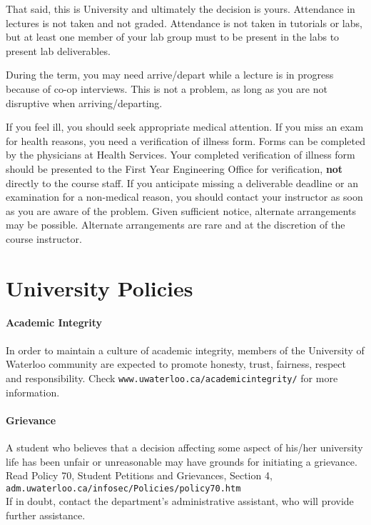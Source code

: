 \documentclass[letterpaper,10pt]{article}
\begin{document}
That said, this is University and ultimately the decision is yours. Attendance in lectures is not taken and not graded. Attendance is not taken in tutorials or labs, but at least one member of your lab group must to be present in the labs to present lab deliverables.

During the term, you may need arrive/depart while a lecture is in progress because of co-op interviews. This is not a problem, as long as you are not disruptive when arriving/departing.

If you feel ill, you should seek appropriate medical attention. If you miss an exam for health reasons, you need a verification of illness form. Forms can be completed by the physicians at Health Services. Your completed verification of illness form should be presented to the First Year Engineering Office for verification, \textbf{not} directly to the course staff. If you anticipate missing a deliverable deadline or an examination for a non-medical reason, you should contact your instructor as soon as you are aware of the problem. Given sufficient notice, alternate arrangements may be possible. Alternate arrangements are rare and at the discretion of the course instructor.


\section*{University Policies}

\paragraph{Academic Integrity}
In order to maintain a culture of academic integrity, members of the University of Waterloo community are expected to promote honesty, trust, fairness, respect and responsibility. Check \texttt{www.uwaterloo.ca/academicintegrity/} for more information.

\paragraph{Grievance}
A student who believes that a decision affecting some aspect of his/her university life has been unfair or unreasonable may have grounds for initiating a grievance. Read Policy 70, Student Petitions and Grievances, Section 4, \texttt{adm.uwaterloo.ca/infosec/Policies/policy70.htm} \\
If in doubt, contact the department's administrative assistant, who will provide further assistance.
\end{document}
